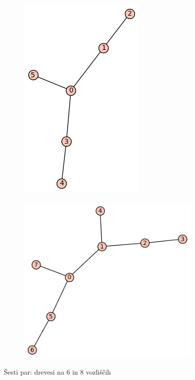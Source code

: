 \documentclass[12pt, a4paper]{article}
\begin{document}
\begin{center}
\begin{figure}[!htb]
\centering
\begin{subfigure}{0.5\textwidth}
  \centering
  \includegraphics[width=0.35\linewidth]{t-11}
\end{subfigure}%
\begin{subfigure}{0.5\textwidth}
  \centering
  \includegraphics[width=0.5\linewidth]{t-30}
\end{subfigure}
\caption{Šesti par: drevesi na 6 in 8 vozliščih}
\label{fig:test}
\end{figure}
\end{center}
\end{document}
